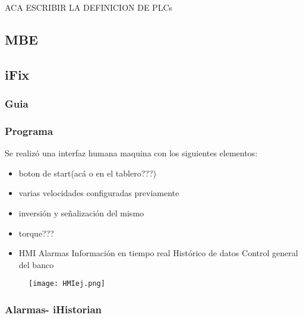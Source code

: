 \begin{tcolorbox}[colback=blue!5!white,colframe=blue!75!black,title=Definición]
	ACA ESCRIBIR LA DEFINICION DE PLCs
\end{tcolorbox}

\subsection{MBE}
\subsection{iFix}
\subsubsection{Guia}
\subsubsection{Programa}


Se realizó una interfaz humana maquina con los siguientes elementos:
	\begin{itemize}
		\item boton de start(acá o en el tablero???)
		\item varias velocidades configuradas previamente
		\item inversión y señalización del mismo
		\item torque???
		\item HMI
        	\subitem Alarmas
       		\subitem Información en tiempo real
        	\subitem Histórico de datos
        	\subitem Control general del banco
	\end{itemize}
	\begin{figure}[htb]
		\centering
		\texttt{[image: HMIej.png]}
	\end{figure}

\subsubsection{Alarmas- iHistorian}